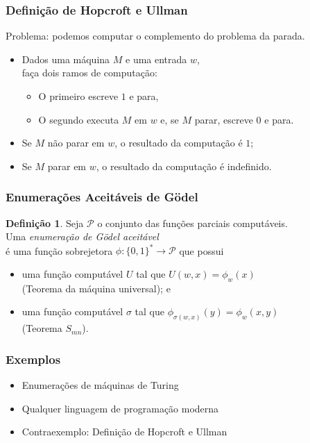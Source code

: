 \documentclass[utf8,notheorems]{beamer}
\theoremstyle{definition}
\newtheorem*{definition}{Definição}
\begin{document}
\begin{frame}
    \frametitle{Definição de Hopcroft e Ullman}
    Problema: podemos computar o complemento do problema da parada.
    \begin{itemize}
        \item Dados uma máquina $M$ e uma entrada $w$, \\
            faça dois ramos de computação:
            \begin{itemize}
                \item O primeiro escreve $1$ e para,
                \item O segundo executa $M$ em $w$ e, se $M$ parar,
                    escreve $0$ e para.
            \end{itemize}
        \item Se $M$ não parar em $w$,
            o resultado da computação é $1$;
        \item Se $M$ parar em $w$,
            o resultado da computação é indefinido.
    \end{itemize}
\end{frame}

\begin{frame}
    \frametitle{Enumerações Aceitáveis de Gödel}
    \begin{definition}
        Seja $\mathcal P$ o conjunto das funções parciais computáveis. \\
        Uma \emph{enumeração de Gödel aceitável} \\
        é uma função sobrejetora $\phi: \{0, 1\}^* \to \mathcal P$ que possui
        \cite[p.~41]{Rogers1987}
        \begin{itemize}
            \item uma função computável $U$ tal que $U(w, x) = \phi_w(x)$ \\
                (Teorema da máquina universal); e
            \item uma função computável $\sigma$ tal que
                    $\phi_{\sigma(w, x)}(y) = \phi_w(x, y)$ \\
                (Teorema $S_{mn}$).
        \end{itemize}
    \end{definition}
\end{frame}

\begin{frame}
    \frametitle{Exemplos}
    \begin{itemize}
        \item Enumerações de máquinas de Turing
        \item Qualquer linguagem de programação moderna
        \item Contraexemplo: Definição de Hopcroft e Ullman
    \end{itemize}
\end{frame}
\end{document}
